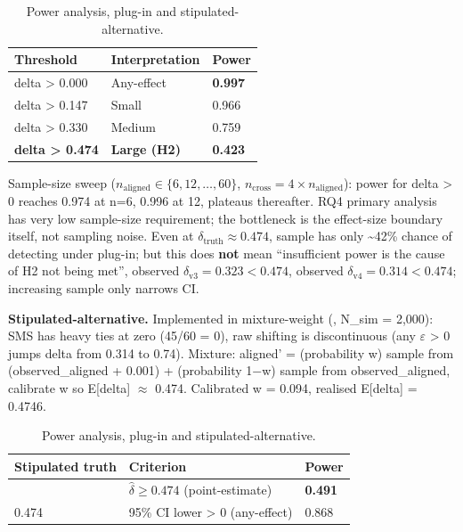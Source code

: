 \documentclass[acmsmall,screen,review]{acmart}
\begin{document}
{\def\LTcaptype{table} %
\begin{longtable}[]{@{}lll@{}}
\caption{Power analysis, plug-in and stipulated-alternative.}\label{tab:p2-23}\\
\toprule\noalign{}
Threshold & Interpretation & Power \\
\midrule\noalign{}
\endfirsthead
\endhead
\bottomrule\noalign{}
\endlastfoot
delta \textgreater{} 0.000 & Any-effect & \textbf{0.997} \\
delta \textgreater{} 0.147 & Small & 0.966 \\
delta \textgreater{} 0.330 & Medium & 0.759 \\
\textbf{delta \textgreater{} 0.474} & \textbf{Large (H2)} &
\textbf{0.423} \\
\end{longtable}
}

Sample-size sweep ($n_{\mathrm{aligned}} \in \{6, 12, \ldots, 60\}$, $n_{\mathrm{cross}} = 4 \times n_{\mathrm{aligned}}$):
power for delta \textgreater{} 0 reaches 0.974 at n=6, 0.996 at 12,
plateaus thereafter. RQ4 primary analysis has very low sample-size
requirement; the bottleneck is the effect-size boundary itself, not
sampling noise. Even at $\delta_{\mathrm{truth}} \approx 0.474$, sample has only
\textasciitilde42\% chance of detecting under plug-in; but this does
\textbf{not} mean ``insufficient power is the cause of H2 not being
met'', observed $\delta_{\mathrm{v3}} = 0.323 < 0.474$, observed
$\delta_{\mathrm{v4}} = 0.314 < 0.474$; increasing sample only narrows CI.

\textbf{Stipulated-alternative.} Implemented in
mixture-weight (,
N\_sim = 2,000): SMS has heavy ties at zero (45/60 = 0), raw shifting is
discontinuous (any $\varepsilon$ \textgreater{} 0 jumps delta from 0.314 to 0.74).
Mixture: aligned' = (probability w) sample from (observed\_aligned +
0.001) + (probability 1−w) sample from observed\_aligned, calibrate w so
E{[}delta{]} $\approx$ 0.474. Calibrated w = 0.094, realised E{[}delta{]} =
0.4746.

{\def\LTcaptype{table} %
\begin{longtable}[]{@{}lll@{}}
\caption{Power analysis, plug-in and stipulated-alternative.}\label{tab:p2-24}\\
\toprule\noalign{}
Stipulated truth & Criterion & Power \\
\midrule\noalign{}
\endfirsthead
\endhead
\bottomrule\noalign{}
\endlastfoot
0.474 & $\hat{\delta} \geq 0.474$ (point-estimate) & \textbf{0.491} \\
0.474 & 95\% CI lower \textgreater{} 0 (any-effect) & 0.868 \\
\end{longtable}
}
\end{document}
